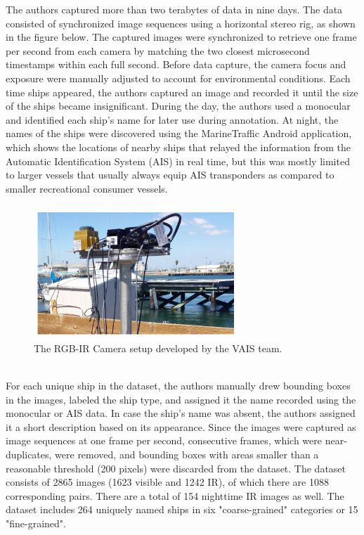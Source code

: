 The authors captured more than two terabytes of data in nine days. The data consisted of synchronized image sequences using a horizontal stereo rig, as shown in the figure below. The captured images were synchronized to retrieve one frame
per second from each camera by matching the two closest microsecond timestamps within each full second. Before data capture, the camera focus and exposure were manually adjusted to account for environmental conditions. Each time ships appeared, the authors captured an image and recorded it until the size of the ships became insignificant. During the day, the authors used a monocular and identified each ship’s name for later use during annotation. At night, the names of the ships were discovered using the MarineTraffic Android application, which shows the locations of nearby ships that relayed the information from the Automatic Identification System (AIS) in real time, but this was mostly limited to larger vessels that usually always equip AIS transponders as compared to smaller recreational consumer vessels. 
\begin{figure}[H]
    \centering
    \includegraphics[width=\textwidth,height=5cm,keepaspectratio=true]{src/Images/vais_gear.PNG}
    \caption{
     The RGB-IR Camera setup developed by the VAIS team. \cite{Zhang_2015_CVPR_Workshops}
     }
\end{figure}
\\

For each unique ship in the dataset, the authors manually drew
bounding boxes in the images, labeled the
ship type, and assigned it the name recorded using the
monocular or AIS data. In case the ship’s name was absent, the authors assigned it a short description based on its appearance. Since the images were captured as image sequences at one frame per second, consecutive frames, which were near-duplicates, were removed, and bounding boxes with areas smaller than a reasonable threshold (200 pixels) were discarded from the dataset. The dataset consists of 2865 images (1623 visible and 1242 IR), of which there are 1088 corresponding pairs. There are a total of 154 nighttime IR images as well. The dataset includes 264 uniquely named ships in six "coarse-grained" categories or 15 "fine-grained". 
\\

